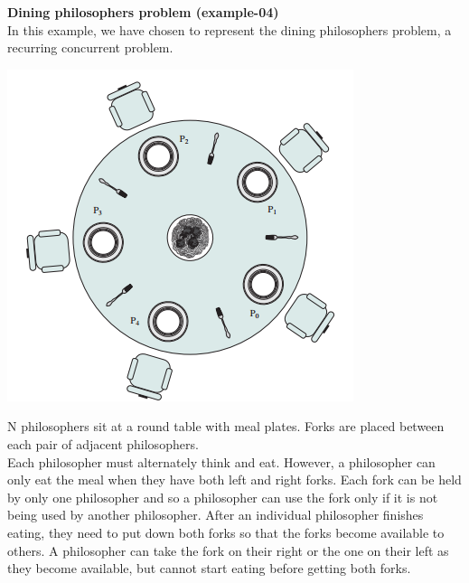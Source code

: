 \documentclass[11pt]{report}
\begin{document}
{}
\tabto{0cm} {\LARGE \textbf{Dining philosophers problem (example-04)}}
\vspace*{3pt}
\vspace*{10pt}
\\
In this example, we have chosen to represent the dining philosophers problem, a recurring concurrent problem.
\begin{center}
\includegraphics[scale = 0.5]{Dining.png}
\end{center}

N philosophers sit at a round table with meal plates. Forks are placed between each pair of adjacent philosophers.
\\ Each philosopher must alternately think and eat. However, a philosopher can only eat the meal when they have both left and right forks. Each fork can be held by only one philosopher and so a philosopher can use the fork only if it is not being used by another philosopher. After an individual philosopher finishes eating, they need to put down both forks so that the forks become available to others. A philosopher can take the fork on their right or the one on their left as they become available, but cannot start eating before getting both forks.
\end{document}
